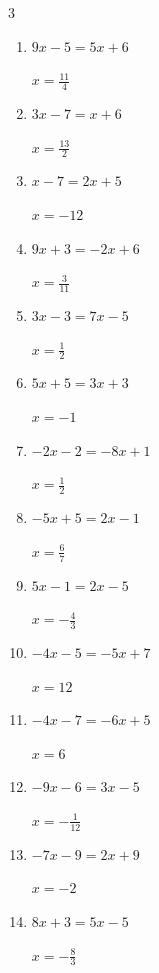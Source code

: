 \begin{multicols}{3}
\begin{enumerate}
        $\displaystyle x=\frac{1}{4}$

  \item $9x-5=5x+6$

        $\displaystyle x=\frac{11}{4}$

  \item $3x-7=x+6$

        $\displaystyle x=\frac{13}{2}$

  \item $x-7=2x+5$

        $\displaystyle x=-12$

  \item $9x+3=-2x+6$

        $\displaystyle x=\frac{3}{11}$

  \item $3x-3=7x-5$

        $\displaystyle x=\frac{1}{2}$

  \item $5x+5=3x+3$

        $\displaystyle x=-1$

  \item $-2x-2=-8x+1$

        $\displaystyle x=\frac{1}{2}$

  \item $-5x+5=2x-1$

        $\displaystyle x=\frac{6}{7}$

  \item $5x-1=2x-5$

        $\displaystyle x=-\frac{4}{3}$

  \item $-4x-5=-5x+7$

        $\displaystyle x=12$

  \item $-4x-7=-6x+5$

        $\displaystyle x=6$

  \item $-9x-6=3x-5$

        $\displaystyle x=-\frac{1}{12}$

  \item $-7x-9=2x+9$

        $\displaystyle x=-2$

\columnbreak %

  \item $8x+3=5x-5$

        $\displaystyle x=-\frac{8}{3}$


\end{enumerate}
\end{multicols}
